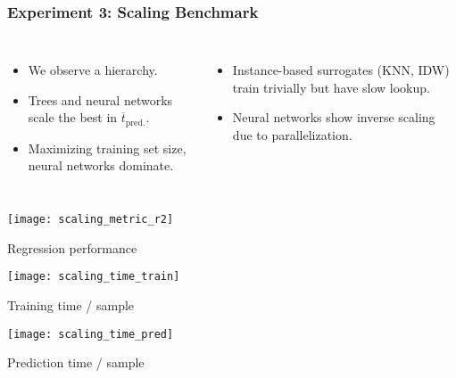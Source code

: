 \begin{frame}
	\frametitle{Experiment 3: Scaling Benchmark}
	\begin{columns}[T]
		\begin{itemize}
			\item
				We observe a hierarchy.
			\item
				\alert{Trees} and \alert{neural networks} scale the
				best in $\overline{t}_\text{pred.}$.
			\item
				Maximizing training set size, \alert{neural networks} dominate.
		\end{itemize}

		\begin{itemize}
			\item
				Instance-based surrogates (KNN, IDW) train trivially but have
				slow lookup.
			\item
				Neural networks show inverse scaling due to
				parallelization.
		\end{itemize}
	\end{columns}

	\vspace{1em}

	\begin{minipage}{0.32\textwidth}
		\texttt{[image: scaling\_metric\_r2]}
		\begin{center}
			\footnotesize
			\vspace{-10pt}
			\hspace{5pt} Regression performance
		\end{center}
	\end{minipage}
	\begin{minipage}{0.32\textwidth}
		\texttt{[image: scaling\_time\_train]}
		\begin{center}
			\footnotesize
			\vspace{-10pt}
			\hspace{5pt} Training time / sample
		\end{center}
	\end{minipage}
	\begin{minipage}{0.32\textwidth}
		\texttt{[image: scaling\_time\_pred]}
		\begin{center}
			\footnotesize
			\vspace{-10pt}
			\hspace{5pt} Prediction time / sample
		\end{center}
	\end{minipage}

\end{frame}

